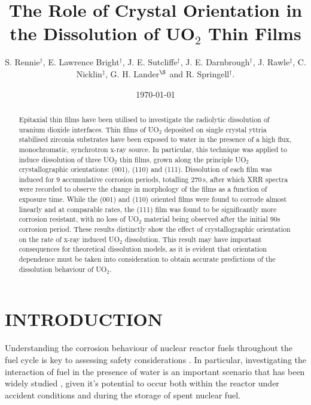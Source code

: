 \documentclass[twocolumn,prl,nobalancelastpage,aps,10pt]{revtex4-1}
\begin{document}
\title{The Role of Crystal Orientation in the Dissolution of UO$_2$ Thin Films}

\author{S. Rennie$^{\dag}$, E. Lawrence Bright$^{\dag}$, J. E. Sutcliffe$^{\dag}$, J. E. Darnbrough$^{\dag}$, J. Rawle$^{\ddag}$, C. Nicklin$^{\ddag}$, G. H. Lander$^{\S}$ and R. Springell$^{\dag}$.}

\begin{abstract}
Epitaxial thin films have been utilised to investigate the radiolytic dissolution of uranium dioxide interfaces. Thin films of UO$_2$ deposited on single crystal yttria stabilised zirconia substrates have been exposed to water in the presence of a high flux, monochromatic, synchrotron x-ray source. In particular, this technique was applied to induce dissolution of three UO$_2$ thin films, grown along the principle UO$_2$ crystallographic orientations: (001), (110) and (111). Dissolution of each film was induced for 9 accumulative corrosion periods, totalling 270\,s, after which XRR spectra were recorded to observe the change in morphology of the films as a function of exposure time. While the (001) and (110) oriented films were found to corrode almost linearly and at comparable rates, the (111) film was found to be significantly more corrosion resistant, with no loss of UO$_2$ material being observed after the initial 90s corrosion period. These results distinctly show the effect of crystallographic orientation on the rate of x-ray induced UO$_2$ dissolution. This result may have important consequences for theoretical dissolution models, as it is evident that orientation dependence must be taken into consideration to obtain accurate predictions of the dissolution behaviour of UO$_2$.
  \end{abstract}
\date{\today}

\maketitle

\section{INTRODUCTION}
Understanding the corrosion behaviour of nuclear reactor fuels throughout the fuel cycle is key to assessing safety considerations \cite{He2012}. In particular, investigating the interaction of fuel in the presence of water is an important scenario that has been widely studied \cite{Shoesmith2000,Sunder1997,Matzke1992,Shoesmith2007}, given it's potential to occur both within the reactor under accident conditions and during the storage of spent nuclear fuel.
\end{document}
